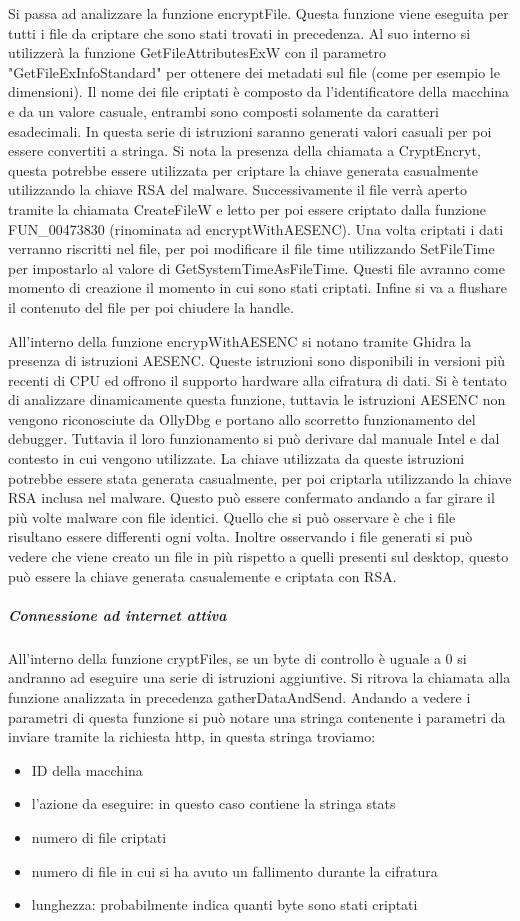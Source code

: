 \documentclass[a4paper,12pt]{article}
\begin{document}
Si passa ad analizzare la funzione encryptFile. Questa funzione viene eseguita per tutti i file da criptare che sono stati trovati in precedenza. Al suo interno si utilizzerà la funzione GetFileAttributesExW con il parametro "GetFileExInfoStandard" per ottenere dei metadati sul file (come per esempio le dimensioni).  Il nome dei file criptati è composto da l'identificatore della macchina e da un valore casuale, entrambi sono composti solamente da caratteri esadecimali. In questa serie di istruzioni saranno generati valori casuali per poi essere convertiti a stringa. 
Si nota la presenza della chiamata a CryptEncryt, questa potrebbe essere utilizzata per criptare la chiave generata casualmente utilizzando la chiave RSA del malware.
Successivamente il file verrà aperto tramite la chiamata CreateFileW e letto per poi essere criptato dalla funzione FUN\_00473830 (rinominata ad encryptWithAESENC). Una volta criptati i dati verranno riscritti nel file, per poi modificare il file time utilizzando SetFileTime per impostarlo al valore di GetSystemTimeAsFileTime. Questi file avranno come momento di creazione il momento in cui sono stati criptati. Infine si va a flushare il contenuto del file per poi chiudere la handle. 

All'interno della funzione encrypWithAESENC si notano tramite Ghidra la presenza di istruzioni AESENC. Queste istruzioni sono disponibili in versioni più recenti di CPU ed offrono il supporto hardware alla cifratura di dati. Si è tentato di analizzare dinamicamente questa funzione, tuttavia le istruzioni AESENC non vengono riconosciute da OllyDbg e portano allo scorretto funzionamento del debugger. Tuttavia il loro funzionamento si può derivare dal manuale Intel e dal contesto in cui vengono utilizzate. La chiave utilizzata da queste istruzioni potrebbe essere stata generata casualmente, per poi criptarla utilizzando la chiave RSA inclusa nel malware. Questo può essere confermato andando a far girare il  più volte malware con file identici. Quello che si può osservare è che i file risultano essere differenti ogni volta. Inoltre osservando i file generati si può vedere che viene creato un file in più rispetto a quelli presenti sul desktop, questo può essere la chiave generata casualemente e criptata con RSA.
 
\subparagraph{Connessione ad internet attiva}
All'interno della funzione cryptFiles, se un byte di controllo è uguale a 0 si andranno ad eseguire una serie di istruzioni aggiuntive. Si ritrova la chiamata alla funzione analizzata in precedenza gatherDataAndSend. Andando a vedere i parametri di questa funzione si può notare una stringa contenente i parametri da inviare tramite la richiesta http, in questa stringa troviamo: \begin{itemize}
	\item ID della macchina
	\item l'azione da eseguire: in questo caso contiene la stringa stats
	\item numero di file criptati
	\item numero di file in cui si ha avuto un fallimento durante la cifratura
	\item lunghezza: probabilmente indica quanti byte sono stati criptati
\end{itemize} 
\end{document}
